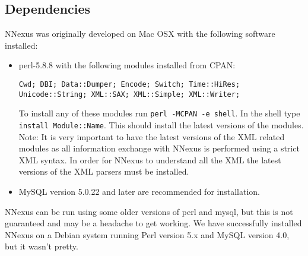 \documentclass[10pt]{article}
\begin{document}
\subsection{Dependencies}
NNexus was originally developed on Mac OSX with the following software installed:
\begin{itemize}
\item perl-5.8.8 with the following modules installed from CPAN:
\begin{verbatim}
Cwd; DBI; Data::Dumper; Encode; Switch; Time::HiRes;
Unicode::String; XML::SAX; XML::Simple; XML::Writer;
\end{verbatim}
To install any of these modules run \texttt{perl -MCPAN -e shell}. In the shell type \texttt{install Module::Name}. This should install the latest versions of the modules. Note: It is very important to have the latest versions of the XML related modules as all information exchange with NNexus is performed using a strict XML syntax. In order for NNexus to understand all the XML the latest versions of the XML
parsers must be installed.

\item MySQL version 5.0.22 and later are recommended for installation.

\end{itemize}
NNexus can be run using some older versions of perl and mysql, but this is not guaranteed and may be a headache to get working. We have successfully installed NNexus on a Debian system running Perl version 5.x and MySQL version 4.0, but it wasn't pretty.
\end{document}
